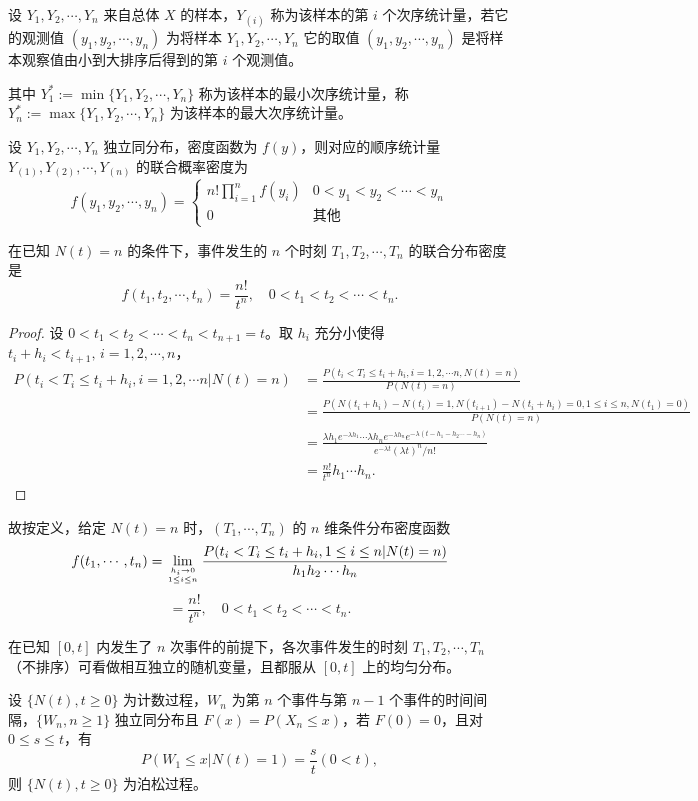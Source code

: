 \documentclass[lang=cn,10pt,thmcnt=section]{elegantbook}
\begin{document}
\begin{definition}
	设 $Y_1, Y_2, \cdots, Y_n$ 来自总体 $X$ 的样本，$Y_{(i)}$ 称为该样本的第 $i$ 个次序统计量，若它的观测值 $(y_1, y_2, \cdots, y_n)$ 为将样本 $Y_1, Y_2, \cdots, Y_n$ 它的取值 $(y_1, y_2, \cdots, y_n)$ 是将样本观察值由小到大排序后得到的第 $i$ 个观测值。

其中 $Y_1^* := \min\{Y_1, Y_2, \cdots, Y_n\}$ 称为该样本的最小次序统计量，称 $Y_n^* := \max\{Y_1, Y_2, \cdots, Y_n\}$ 为该样本的最大次序统计量。

设 $Y_1, Y_2, \cdots, Y_n$ 独立同分布，密度函数为 $f(y)$，则对应的顺序统计量 $Y_{(1)}, Y_{(2)}, \cdots, Y_{(n)}$ 的联合概率密度为
\[
f(y_1, y_2, \cdots, y_n) = 
\begin{cases} 
n! \prod_{i=1}^{n} f(y_i) & 0 < y_1 < y_2 < \cdots < y_n \\
0 & \text{其他}
\end{cases}
\]
\end{definition}
\begin{theorem}
	在已知 $N(t) = n$ 的条件下，事件发生的 $n$ 个时刻 $T_1, T_2, \cdots, T_n$ 的联合分布密度是
\[
f(t_1, t_2, \cdots, t_n) = \frac{n!}{t^n}, \quad 0 < t_1 < t_2 < \cdots < t_n.
\]
\end{theorem}
\begin{proof}
	设 $0 < t_1 < t_2 < \cdots < t_n < t_{n+1} = t$。取 $h_i$ 充分小使得 $t_i + h_i < t_{i+1}, \, i = 1, 2, \cdots, n$，
	\begin{align*}
	P(t_i < T_i \leq t_i + h_i, i = 1, 2, \cdots n | N(t) = n) &= \frac{P(t_i < T_i \leq t_i + h_i, i = 1, 2, \cdots n, N(t) = n)}{P(N(t) = n)} \\
	&= \frac{P(N(t_i + h_i) - N(t_i) = 1, N(t_{i+1}) - N(t_i + h_i) = 0, 1 \leq i \leq n, N(t_1) = 0)}{P(N(t) = n)} \\
	&= \frac{\lambda h_1 e^{-\lambda h_1} \cdots \lambda h_n e^{-\lambda h_n} e^{-\lambda(t - h_1 - h_2 \cdots - h_n)}}{e^{-\lambda t} (\lambda t)^n / n!} \\
	&= \frac{n!}{t^n} h_1 \cdots h_n.
	\end{align*}
\end{proof}
故按定义，给定 $N(t) = n$ 时，$(T_1, \cdots, T_n)$ 的 $n$ 维条件分布密度函数
\[
f(t_1, \cdots, t_n) = \lim_{h_i \to 0 \atop 1 \leq i \leq n} \frac{P(t_i < T_i \leq t_i + h_i, 1 \leq i \leq n | N(t) = n)}{h_1 h_2 \cdots h_n}
\]
\[
= \frac{n!}{t^n}, \quad 0 < t_1 < t_2 < \cdots < t_n.
\]
\begin{remark}
	在已知 $[0,t]$ 内发生了 $n$ 次事件的前提下，各次事件发生的时刻 $T_1, T_2, \cdots, T_n$（不排序）可看做相互独立的随机变量，且都服从 $[0,t]$ 上的均匀分布。
\end{remark}
\begin{theorem}
	设 $\{N(t), t \geq 0\}$ 为计数过程，$W_n$ 为第 $n$ 个事件与第 $n-1$ 个事件的时间间隔，$\{W_n, n \geq 1\}$ 独立同分布且 $F(x) = P(X_n \leq x)$，若 $F(0) = 0$，且对 $0 \leq s \leq t$，有
\[
P(W_1 \leq x | N(t) = 1) = \frac{s}{t} (0 < t),
\]
则 $\{N(t), t \geq 0\}$ 为泊松过程。
\end{theorem}
\end{document}
